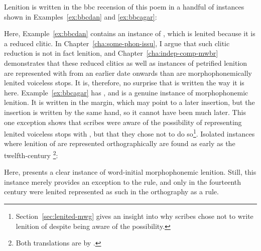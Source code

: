 Lenition is written in the \gls{bbc} recension of this poem in a handful of instances shown in Examples~\ref{ex:bbcdan} and \ref{ex:bbcagar}:
\begin{mwl}
\end{mwl}
Here, Example~\ref{ex:bbcdan} contains an instance of , which is lenited because it is a reduced clitic. In Chapter~\ref{cha:some-phon-issu}, I argue that such clitic reduction is not in fact lenition, and Chapter~\ref{cha:indep-comp-mwbr} demonstrates that these reduced clitics as well as instances of petrified lenition are represented with  from an earlier date onwards than are morphophonemically lenited voiceless stops. It is, therefore, no surprise that  is written the way it is here. Example~\ref{ex:bbcagar} has , and is a genuine instance of morphophonemic lenition. It is written in the margin, which may point to a later insertion, but the insertion is written by the same hand, so it cannot have been much later. This one exception shows that scribes were aware of the possibility of representing lenited voiceless stops with , but that they chose not to do so\footnote{Section~\ref{sec:lenited-mwg} gives an insight into why scribes chose not to write lenition of  despite being aware of the possibility.}. Isolated instances where lenition of  are represented orthographically are found as early as the twelfth-century \footnote{Both translations are by \textcite[136]{davies_braint_1974}.}:
\begin{mwl}
\end{mwl}
Here,   presents a clear instance of word-initial morphophonemic lenition. Still, this instance merely  provides an exception to the rule, and only in the fourteenth century  were lenited   represented as such in the orthography as a rule.

